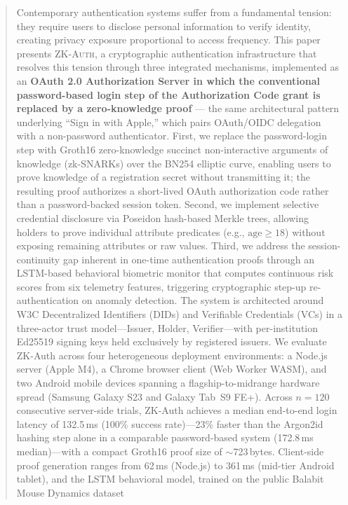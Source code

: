 \documentclass[journal,twoside,10pt]{IEEEtran}
\begin{document}
\begin{abstract}
Contemporary authentication systems suffer from a fundamental tension: they
require users to disclose personal information to verify identity, creating
privacy exposure proportional to access frequency. This paper presents
\textsc{ZK-Auth}, a cryptographic authentication infrastructure that resolves
this tension through three integrated mechanisms, implemented as an
\textbf{OAuth 2.0 Authorization Server in which the conventional
password-based login step of the Authorization Code grant is replaced by a
zero-knowledge proof} --- the same architectural pattern underlying
``Sign in with Apple,'' which pairs OAuth/OIDC delegation with a
non-password authenticator. First, we replace the password-login step with
Groth16 zero-knowledge succinct non-interactive arguments of knowledge
(zk-SNARKs) over the BN254 elliptic curve, enabling users to prove knowledge
of a registration secret without transmitting it; the resulting proof
authorizes a short-lived OAuth authorization code rather than a
password-backed session token. Second, we implement selective credential
disclosure via Poseidon hash-based Merkle trees, allowing holders to prove
individual attribute predicates (e.g., $\text{age} \geq 18$) without
exposing remaining attributes or raw values. Third, we address the
session-continuity gap inherent in one-time authentication proofs through an
LSTM-based behavioral biometric monitor that computes continuous risk scores
from six telemetry features, triggering cryptographic step-up
re-authentication on anomaly detection. The system is architected around W3C
Decentralized Identifiers (DIDs) and Verifiable Credentials (VCs) in a
three-actor trust model---Issuer, Holder, Verifier---with per-institution
Ed25519 signing keys held exclusively by registered issuers. We evaluate
ZK-Auth across four heterogeneous deployment environments: a Node.js server
(Apple M4), a Chrome browser client (Web Worker WASM), and two Android
mobile devices spanning a flagship-to-midrange hardware spread (Samsung
Galaxy S23 and Galaxy Tab~S9 FE+). Across $n=120$ consecutive server-side
trials, ZK-Auth achieves a median end-to-end login latency of 132.5\,ms
(100\% success rate)---23\% faster than the Argon2id hashing step alone in
a comparable password-based system (172.8\,ms median)---with a compact
Groth16 proof size of $\sim$723\,bytes. Client-side proof generation ranges
from 62\,ms (Node.js) to 361\,ms (mid-tier Android tablet), and the LSTM
behavioral model, trained on the public Balabit Mouse Dynamics dataset

\end{abstract}
\end{document}

